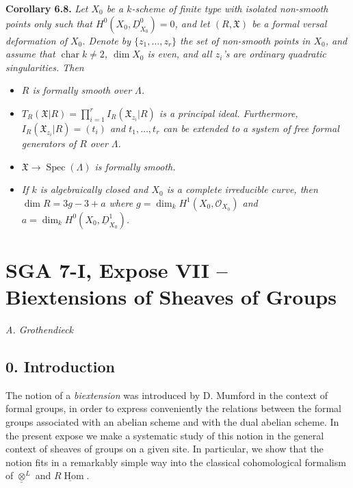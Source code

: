 \documentclass[11pt]{article}
\theoremstyle{plain}
\theoremstyle{definition}
\theoremstyle{remark}
\DeclareMathOperator{\Spec}{Spec}
\DeclareMathOperator{\Hom}{Hom}
\begin{document}
\medskip
\noindent\textbf{Corollary 6.8.} \textit{Let $X_0$ be a $k$-scheme of finite type with isolated non-smooth points only such that $H^0(X_0, \underline{D}_{X_0}^0) = 0$, and let $(R, \mathfrak{X})$ be a formal versal deformation of $X_0$. Denote by $\{z_1, \ldots, z_r\}$ the set of non-smooth points in $X_0$, and assume that $\operatorname{char} k \neq 2$, $\dim X_0$ is even, and all $z_i$'s are ordinary quadratic singularities. Then}
\begin{itemize}
\item[(1)] \textit{$R$ is formally smooth over $\Lambda$.}
\item[(2)] \textit{$T_R(\mathfrak{X}|R) = \prod_{i=1}^r I_R(\mathfrak{X}_{z_i}|R)$ is a principal ideal. Furthermore, $I_R(\mathfrak{X}_{z_i}|R) = (t_i)$ and $t_1, \ldots, t_r$ can be extended to a system of free formal generators of $R$ over $\Lambda$.}
\item[(3)] \textit{$\mathfrak{X} \to \Spec(\Lambda)$ is formally smooth.}
\item[(4)] \textit{If $k$ is algebraically closed and $X_0$ is a complete irreducible curve, then $\dim R = 3g - 3 + a$ where $g = \dim_k H^1(X_0, \mathcal{O}_{X_0})$ and $a = \dim_k H^0(X_0, \underline{D}_{X_0}^1)$.}
\end{itemize}

\clearpage
\section*{SGA 7-I, Expose VII -- Biextensions of Sheaves of Groups}

\begin{center}
\textit{A. Grothendieck}
\end{center}

\subsection*{0. Introduction}

The notion of a \emph{biextension} was introduced by D. Mumford in the context of formal groups, in order to express conveniently the relations between the formal groups associated with an abelian scheme and with the dual abelian scheme. In the present expose we make a systematic study of this notion in the general context of sheaves of groups on a given site. In particular, we show that the notion fits in a remarkably simple way into the classical cohomological formalism of $\underline{\otimes}^{L}$ and $\underline{R\!\Hom}$.
\end{document}
